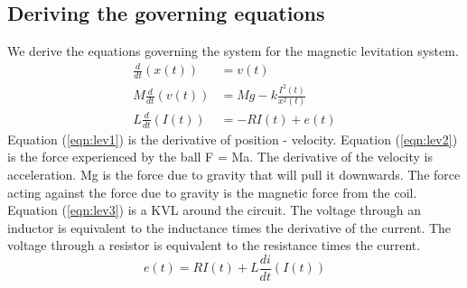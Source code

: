 \documentclass{article}
\begin{document}
    \subsection{Deriving the governing equations}
    We derive the equations governing the system for the magnetic levitation system.
    \begin{align} 
        \label{eqn:lev1}
        \frac{d}{dt}(x(t))&=v(t)\\
        \label{eqn:lev2}
        M\frac{d}{dt}(v(t))&=Mg-k\frac{I^2(t)}{x^2(t)}\\
        \label{eqn:lev3}
        L\frac{d}{dt}(I(t))&=-RI(t)+e(t)
    \end{align} 
    Equation (\ref{eqn:lev1}) is the derivative of position - velocity.
    Equation (\ref{eqn:lev2}) is the force experienced by the ball F = Ma.
    The derivative of the velocity is acceleration.
    Mg is the force due to gravity that will pull it downwards.
    The force acting against the force due to gravity is the magnetic force from the coil.  
    Equation (\ref{eqn:lev3}) is a KVL around the circuit.
    The voltage through an inductor is equivalent to the inductance times the derivative of the current. The voltage through a resistor is equivalent to the resistance times the current.  
    \begin{equation}
        e(t) = RI(t) + L\frac{di}{dt}(I(t))
    \end{equation}
\end{document}
